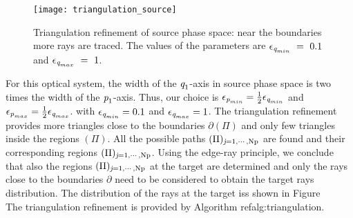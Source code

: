 \begin{figure}[h]
  \begin{center}
  \texttt{[image: triangulation\_source]}
  \end{center}
  \caption{Triangulation refinement of source phase space:
  near the boundaries more rays are traced.
    The values of the parameters are $\epsilon_{\textit{q}_{min}}~=~ 0.1$ and $\epsilon_{\textit{q}_{max}}~=~1$.}
   \label{fig:triangulation_refinement}
  \end{figure}
For this optical system, the width of the $\textit{q}_1$-axis in source phase space is two times the width of the $\textit{p}_1$-axis.
Thus, our choice is $\epsilon_{\textit{p}_{min}}=\frac{1}{2}\epsilon_{\textit{q}_{min}}$ and $\epsilon_{\textit{p}_{max}} = \frac{1}{2}\epsilon_{\textit{q}_{max}}$.
with $\epsilon_{\textit{q}_{min}}=0.1$ and $\epsilon_{\textit{q}_{max}}=1$.
The triangulation refinement provides more triangles close to the boundaries $\partial$$(\Pi)$ and only few triangles inside the regions $(\Pi)$. 
All the possible paths $(\Pi)_{\textit{j} = 1, \cdots, \textrm{Np}}$ are found and their corresponding regions $(\Pi)_{\textit{j} = 1, \cdots, \textrm{Np}}$. Using the edge-ray principle, we conclude that also the regions $(\Pi)_{\textit{j} = 1, \cdots, \textrm{Np}}$ at the target are determined and only the rays close to the boundaries 
$\partial$ need to be considered to obtain the target rays distribution. The distribution of the rays at the target iss shown in Figure 
\\ \indent The triangulation refinement is provided by Algorithm ref{alg:triangulation}.
 \\ \indent 
